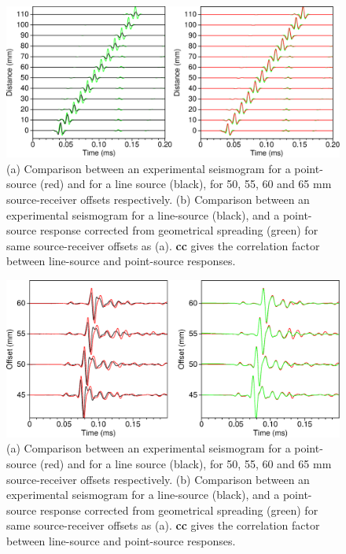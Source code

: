 \documentclass[manuscript,revised]{geophysics}
\begin{document}
\begin{figure}[!h]
	\centering
	\includegraphics[scale=0.5]{fig/trans2d3d.eps}
	\caption{(a) Comparison between an experimental seismogram for a point-source (red) and for a line source (black), for 50, 55, 60 and 65 mm source-receiver offsets respectively. (b) Comparison between an experimental seismogram for a line-source (black), and a point-source response corrected from geometrical spreading (green) for same source-receiver offsets as (a). \textbf{cc} gives the correlation factor between line-source and point-source responses.}
	\label{panel_amplitude_sem}
\end{figure}

\begin{figure}[!h]
	\centering
	\includegraphics[scale=0.5]{fig/trans2d3d-musc.eps}
	\caption{(a) Comparison between an experimental seismogram for a point-source (red) and for a line source (black), for 50, 55, 60 and 65 mm source-receiver offsets respectively. (b) Comparison between an experimental seismogram for a line-source (black), and a point-source response corrected from geometrical spreading (green) for same source-receiver offsets as (a). \textbf{cc} gives the correlation factor between line-source and point-source responses.}
	\label{panel_amplitude}
\end{figure}
\end{document}

